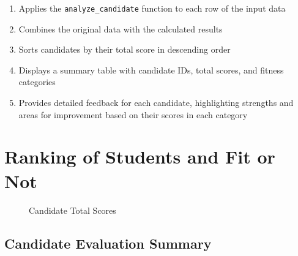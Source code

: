 \documentclass{article}
\begin{document}
\begin{enumerate}
    \item Applies the \texttt{analyze\_candidate} function to each row of the input data
    \item Combines the original data with the calculated results
    \item Sorts candidates by their total score in descending order
    \item Displays a summary table with candidate IDs, total scores, and fitness categories
    \item Provides detailed feedback for each candidate, highlighting strengths and areas for improvement based on their scores in each category
\end{enumerate}



\section{Ranking of Students and Fit or Not}
\begin{figure}[htbp]
    \centering
    \caption{Candidate Total Scores}
    \label{fig:candidate-scores}
    \end{figure}
    
\subsection{Candidate Evaluation Summary}
\end{document}
